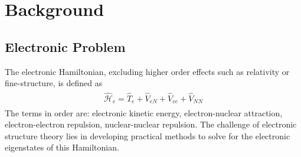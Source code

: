 \documentclass[final,3p,times,twocolumn]{elsarticle}
\newcommand{\ssth}{\textsuperscript{th}}
\newcommand{\ham}{\hat{\mathcal{H}}}
\begin{document}
\section{Background}
\subsection{Electronic Problem} \label{sec:elproblem}
The electronic Hamiltonian, excluding higher order effects such as relativity or fine-structure, is defined as
\begin{gather}
\begin{gathered}\label{eq:hame}
\ham_e = \hat T_e + \hat V_{eN} + \hat V_{ee} + \hat V_{NN}
\end{gathered}
\end{gather}
The terms in order are: electronic kinetic energy, electron-nuclear attraction, electron-electron repulsion, nuclear-nuclear repulsion. %
The challenge of electronic structure theory lies in developing practical methods to solve for the electronic eigenstates of this Hamiltonian. %
\end{document}
